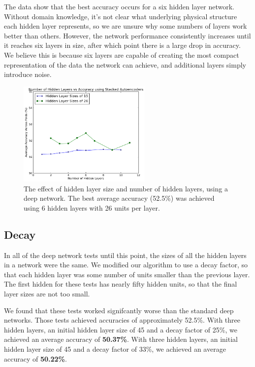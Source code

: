 \documentclass[letterpaper,twocolumn,12pt]{article}
\begin{document}
The data show that the best accuracy occurs for a six hidden layer network.
Without domain knowledge, it's not clear what underlying physical structure each hidden layer represents, so we are unsure why some numbers of layers work better than others.
However, the network performance consistently increases until it reaches six layers in size, after which point there is a large drop in accuracy.
We believe this is because six layers are capable of creating the most compact representation of the data the network can achieve, and additional layers simply introduce noise.

\begin{figure}[ht!]
\centering
\includegraphics[width=65mm]{results/deep/numLayers/deep_numLayers.png}
\caption{The effect of hidden layer size and number of hidden layers, using a deep network. The best average accuracy (52.5\%) was achieved using 6 hidden layers with 26 units per layer.}
\label{fig:deep_num_hidden_layers}
\end{figure}

\subsection{Decay}
In all of the deep network tests until this point, the sizes of all the hidden layers in a network were the same.
We modified our algorithm to use a decay factor, so that each hidden layer was some number of units smaller than the previous layer.
The first hidden for these tests has nearly fifty hidden units, so that the final layer sizes are not too small.

We found that these tests worked signifcantly worse than the standard deep networks.
Those tests achieved accuracies of approximately 52.5\%.
With three hidden layers, an initial hidden layer size of 45 and a decay factor of 25\%, we achieved an average accuracy of \textbf{50.37\%}.
With three hidden layers, an initial hidden layer size of 45 and a decay factor of 33\%, we achieved an average accuracy of \textbf{50.22\%}.
\end{document}
